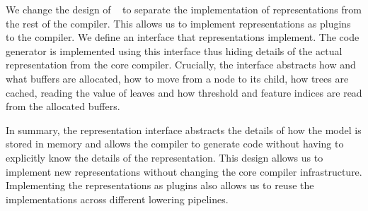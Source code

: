 We change the design of \TreebeardOLD{}~\cite{Treebeard} to
separate the implementation of representations from the rest of the compiler. This allows
us to implement representations as plugins to the compiler. We define an interface 
that representations implement. The code generator is implemented using
this interface thus hiding details of the actual representation from the core 
compiler. Crucially, the interface abstracts how and what buffers 
are allocated, how to move from a node to its child, how trees 
are cached, reading the value of leaves and how threshold and 
feature indices are read from the allocated buffers.

In summary, the representation interface abstracts the details of how the model is stored in memory
and allows the compiler to generate code without having to explicitly know the details of the
representation. This design allows us to implement new representations without changing the core
compiler infrastructure. Implementing the representations as plugins also allows us to reuse
the implementations across different lowering pipelines. 

